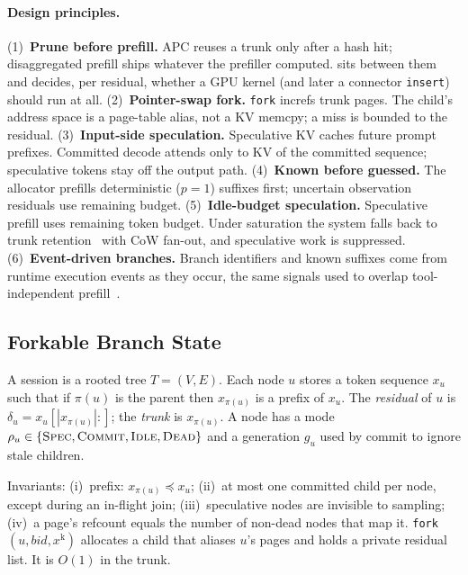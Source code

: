 \paragraph{Design principles.}
(1)~\textbf{Prune before prefill.} APC reuses a trunk only after a hash hit; disaggregated prefill ships whatever the prefiller computed. \app sits between them and decides, per residual, whether a GPU kernel (and later a connector \texttt{insert}) should run at all.
(2)~\textbf{Pointer-swap fork.} \texttt{fork} increfs trunk pages. The child's address space is a page-table alias, not a KV memcpy; a miss is bounded to the residual.
(3)~\textbf{Input-side speculation.} Speculative KV caches future prompt prefixes. Committed decode attends only to KV of the committed sequence; speculative tokens stay off the output path.
(4)~\textbf{Known before guessed.} The allocator prefills deterministic ($p{=}1$) suffixes first; uncertain observation residuals use remaining budget.
(5)~\textbf{Idle-budget speculation.} Speculative prefill uses remaining token budget. Under saturation the system falls back to trunk retention~\cite{continuum} with CoW fan-out, and speculative work is suppressed.
(6)~\textbf{Event-driven branches.} Branch identifiers and known suffixes come from runtime execution events as they occur, the same signals used to overlap tool-independent prefill~\cite{sutradhara}.

\subsection{Forkable Branch State}
\label{sec:state}

\begin{definition}
A session is a rooted tree $T=(V,E)$.
Each node $u$ stores a token sequence $x_u$ such that if $\pi(u)$ is the parent then $x_{\pi(u)}$ is a prefix of $x_u$.
The \emph{residual} of $u$ is $\delta_u = x_u[|x_{\pi(u)}|{:}]$; the \emph{trunk} is $x_{\pi(u)}$.
A node has a mode $\rho_u\in\{\textsc{Spec},\textsc{Commit},\textsc{Idle},\textsc{Dead}\}$ and a generation $g_u$ used by commit to ignore stale children.
\end{definition}

Invariants: (i)~prefix: $x_{\pi(u)}\preceq x_u$; (ii)~at most one committed child per node, except during an in-flight join; (iii)~speculative nodes are invisible to sampling; (iv)~a page's refcount equals the number of non-dead nodes that map it.
\texttt{fork}$(u,\mathit{bid},x^{\mathrm{k}})$ allocates a child that aliases $u$'s pages and holds a private residual list. It is $O(1)$ in the trunk.

